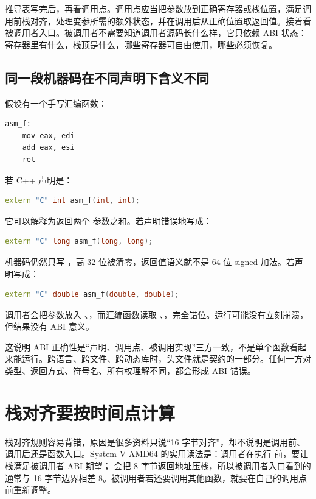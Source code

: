 推导表写完后，再看调用点。调用点应当把参数放到正确寄存器或栈位置，满足调用前栈对齐，处理变参所需的额外状态，并在调用后从正确位置取返回值。接着看被调用者入口。被调用者不需要知道调用者源码长什么样，它只依赖 ABI 状态：寄存器里有什么，栈顶是什么，哪些寄存器可自由使用，哪些必须恢复。

\subsection{同一段机器码在不同声明下含义不同}

假设有一个手写汇编函数：

\begin{lstlisting}
asm_f:
    mov eax, edi
    add eax, esi
    ret
\end{lstlisting}

若 C++ 声明是：

\begin{lstlisting}[language=C++]
extern "C" int asm_f(int, int);
\end{lstlisting}

它可以解释为返回两个  参数之和。若声明错误地写成：

\begin{lstlisting}[language=C++]
extern "C" long asm_f(long, long);
\end{lstlisting}

机器码仍然只写 ，高 32 位被清零，返回值语义就不是 64 位 signed 加法。若声明写成：

\begin{lstlisting}[language=C++]
extern "C" double asm_f(double, double);
\end{lstlisting}

调用者会把参数放入 、，而汇编函数读取 、，完全错位。运行可能没有立刻崩溃，但结果没有 ABI 意义。

这说明 ABI 正确性是“声明、调用点、被调用实现”三方一致，不是单个函数看起来能运行。跨语言、跨文件、跨动态库时，头文件就是契约的一部分。任何一方对类型、返回方式、符号名、所有权理解不同，都会形成 ABI 错误。

\section{栈对齐要按时间点计算}

栈对齐规则容易背错，原因是很多资料只说“16 字节对齐”，却不说明是调用前、调用后还是函数入口。System V AMD64 的实用读法是：调用者在执行  前，要让栈满足被调用者 ABI 期望； 会把 8 字节返回地址压栈，所以被调用者入口看到的  通常与 16 字节边界相差 8。被调用者若还要调用其他函数，就要在自己的调用点前重新调整。

